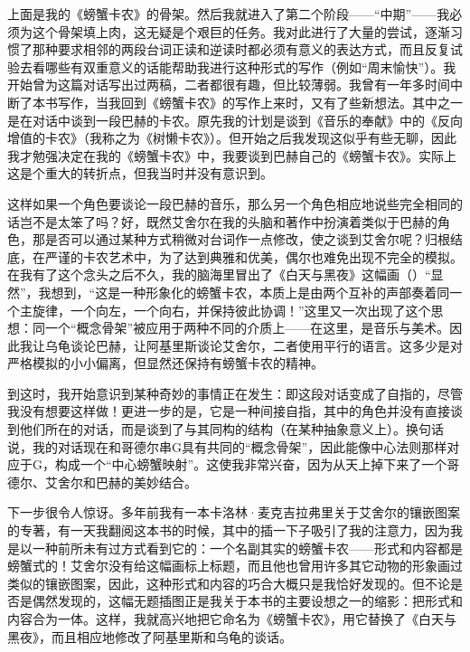 \begin{description}[wide,format=\em\itemcolon,labelsep=\ccwd]
\item[中期]上面是我的《螃蟹卡农》的骨架。然后我就进入了第二个阶段——“中期”——我必须为这个骨架填上肉，这无疑是个艰巨的任务。我对此进行了大量的尝试，逐渐习惯了那种要求相邻的两段台词正读和逆读时都必须有意义的表达方式，而且反复试验去看哪些有双重意义的话能帮助我进行这种形式的写作（例如“周末愉快”）。我开始曾为这篇对话写出过两稿，二者都很有趣，但比较薄弱。我曾有一年多时间中断了本书写作，当我回到《螃蟹卡农》的写作上来时，又有了些新想法。其中之一是在对话中谈到一段巴赫的卡农。原先我的计划是谈到《音乐的奉献》中的《反向增值的卡农》（我称之为《树懒卡农》）。但开始之后我发现这似乎有些无聊，因此我才勉强决定在我的《螃蟹卡农》中，我要谈到巴赫自己的《螃蟹卡农》。实际上这是个重大的转折点，但我当时并没有意识到。

这样如果一个角色要谈论一段巴赫的音乐，那么另一个角色相应地说些完全相同的话岂不是太笨了吗？好，既然艾舍尔在我的头脑和著作中扮演着类似于巴赫的角色，那是否可以通过某种方式稍微对台词作一点修改，使之谈到艾舍尔呢？归根结底，在严谨的卡农艺术中，为了达到典雅和优美，偶尔也难免出现不完全的模拟。在我有了这个念头之后不久，我的脑海里冒出了《白天与黑夜》这幅画（）“显然”，我想到，“这是一种形象化的螃蟹卡农，本质上是由两个互补的声部奏着同一个主旋律，一个向左，一个向右，并保持彼此协调！”这里又一次出现了这个思想：同一个“概念骨架”被应用于两种不同的介质上——在这里，是音乐与美术。因此我让乌龟谈论巴赫，让阿基里斯谈论艾舍尔，二者使用平行的语言。这多少是对严格模拟的小小偏离，但显然还保持有螃蟹卡农的精神。

到这时，我开始意识到某种奇妙的事情正在发生：即这段对话变成了自指的，尽管我没有想要这样做！更进一步的是，它是一种间接自指，其中的角色并没有直接谈到他们所在的对话，而是谈到了与其同构的结构（在某种抽象意义上）。换句话说，我的对话现在和哥德尔串G具有共同的“概念骨架”，因此能像中心法则那样对应于G，构成一个“中心螃蟹映射”。这使我非常兴奋，因为从天上掉下来了一个哥德尔、艾舍尔和巴赫的美妙结合。

\item[后期]下一步很令人惊讶。多年前我有一本卡洛林·麦克吉拉弗里关于艾舍尔的镶嵌图案的专著，有一天我翻阅这本书的时候，其中的插一下子吸引了我的注意力，因为我是以一种前所未有过方式看到它的：一个名副其实的螃蟹卡农——形式和内容都是螃蟹式的！艾舍尔没有给这幅画标上标题，而且他也曾用许多其它动物的形象画过类似的镶嵌图案，因此，这种形式和内容的巧合大概只是我恰好发现的。但不论是否是偶然发现的，这幅无题插图正是我关于本书的主要设想之一的缩影：把形式和内容合为一体。这样，我就高兴地把它命名为《螃蟹卡农》，用它替换了《白天与黑夜》，而且相应地修改了阿基里斯和乌龟的谈话。


\end{description}
